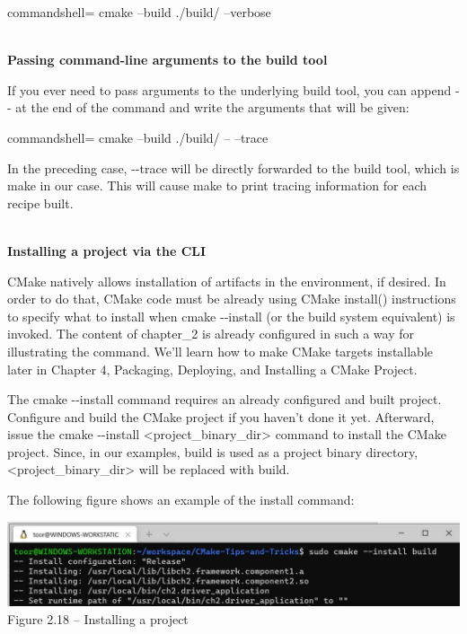 \begin{tcblisting}{commandshell={}}
cmake --build ./build/ --verbose
\end{tcblisting}

\hspace*{\fill} \\ %
\noindent
\textbf{Passing command-line arguments to the build tool}

If you ever need to pass arguments to the underlying build tool, you can append -{}- at the end of the command and write the arguments that will be given:

\begin{tcblisting}{commandshell={}}
cmake --build ./build/ -- --trace
\end{tcblisting}

In the preceding case, -{}-trace will be directly forwarded to the build tool, which is make in our case. This will cause make to print tracing information for each recipe built.

\hspace*{\fill} \\ %
\noindent
\textbf{Installing a project via the CLI}

CMake natively allows installation of artifacts in the environment, if desired. In order to do that, CMake code must be already using CMake install() instructions to specify what to install when cmake -{}-install (or the build system equivalent) is invoked. The content of chapter\_2 is already configured in such a way for illustrating the command. We'll learn how to make CMake targets installable later in Chapter 4, Packaging, Deploying, and Installing a CMake Project.

The cmake -{}-install command requires an already configured and built project. Configure and build the CMake project if you haven't done it yet. Afterward, issue the cmake -{}-install <project\_binary\_dir> command to install the CMake project. Since, in our examples, build is used as a project binary directory, <project\_binary\_dir> will be replaced with build.

The following figure shows an example of the install command:

\begin{center}
\includegraphics[width=1.\textwidth]{content/1/chapter2/images/18.jpg}\\
Figure 2.18 – Installing a project
\end{center}

